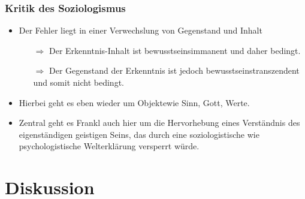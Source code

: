 \documentclass{beamer}
\begin{document}
\begin{frame}
\frametitle{Kritik des Soziologismus}

  \begin{itemize}
  \setlength{\itemsep}{10pt}
  
    \item Der Fehler liegt in einer Verwechslung von Gegenstand und Inhalt
    \begin{itemize}
      \item[$\Rightarrow$] Der Erkenntnis-Inhalt ist \glqq{}bewusstseinsimmanent\grqq{} und daher bedingt.
      \item[$\Rightarrow$] Der Gegenstand der Erkenntnis ist jedoch \glqq{}bewusstseinstranszendent\grqq{} und somit nicht bedingt.
    \end{itemize}  

    \pause  
    
    \item Hierbei geht es eben wieder um \glqq Objekte\grqq  wie Sinn, Gott, Werte.

    \pause  
    
    \item Zentral geht es Frankl auch hier um die Hervorhebung eines Verständnis des eigenständigen geistigen Seins, das durch eine soziologistische wie psychologistische Welterklärung versperrt würde. \parencite{Leser2005}
  \end{itemize}

\end{frame}


\section{Diskussion}
\end{document}
